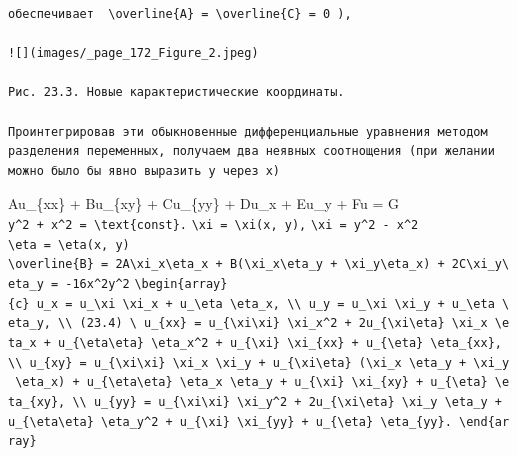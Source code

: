 \documentclass[
  ukrainian,
]{article}
\begin{document}
\begin{verbatim}
обеспечивает  \overline{A} = \overline{C} = 0 ),

![](images/_page_172_Figure_2.jpeg)

Рис. 23.3. Новые карактеристические координаты.

Проинтегрировав эти обыкновенные дифференциальные уравнения методом разделения переменных, получаем два неявных соотнощения (при желании можно было бы явно выразить у через х)
\end{verbatim}

Au\_\{xx\} + Bu\_\{xy\} + Cu\_\{yy\} + Du\_x + Eu\_y + Fu = G
\texttt{y\^{}2\ +\ x\^{}2\ =\ \textbackslash{}text\{const\}.}
\texttt{\textbackslash{}xi\ =\ \textbackslash{}xi(x,\ y),}
\texttt{\textbackslash{}xi\ =\ y\^{}2\ -\ x\^{}2}
\texttt{\textbackslash{}eta\ =\ \textbackslash{}eta(x,\ y)}
\texttt{\textbackslash{}overline\{B\}\ =\ 2A\textbackslash{}xi\_x\textbackslash{}eta\_x\ +\ B(\textbackslash{}xi\_x\textbackslash{}eta\_y\ +\ \textbackslash{}xi\_y\textbackslash{}eta\_x)\ +\ 2C\textbackslash{}xi\_y\textbackslash{}eta\_y\ =\ -16x\^{}2y\^{}2}
\texttt{\textbackslash{}begin\{array\}\{c\}\ u\_x\ =\ u\_\textbackslash{}xi\ \textbackslash{}xi\_x\ +\ u\_\textbackslash{}eta\ \textbackslash{}eta\_x,\ \textbackslash{}\textbackslash{}\ u\_y\ =\ u\_\textbackslash{}xi\ \textbackslash{}xi\_y\ +\ u\_\textbackslash{}eta\ \textbackslash{}eta\_y,\ \textbackslash{}\textbackslash{}\ (23.4)\ \textbackslash{}\ u\_\{xx\}\ =\ u\_\{\textbackslash{}xi\textbackslash{}xi\}\ \textbackslash{}xi\_x\^{}2\ +\ 2u\_\{\textbackslash{}xi\textbackslash{}eta\}\ \textbackslash{}xi\_x\ \textbackslash{}eta\_x\ +\ u\_\{\textbackslash{}eta\textbackslash{}eta\}\ \textbackslash{}eta\_x\^{}2\ +\ u\_\{\textbackslash{}xi\}\ \textbackslash{}xi\_\{xx\}\ +\ u\_\{\textbackslash{}eta\}\ \textbackslash{}eta\_\{xx\},\ \textbackslash{}\textbackslash{}\ u\_\{xy\}\ =\ u\_\{\textbackslash{}xi\textbackslash{}xi\}\ \textbackslash{}xi\_x\ \textbackslash{}xi\_y\ +\ u\_\{\textbackslash{}xi\textbackslash{}eta\}\ (\textbackslash{}xi\_x\ \textbackslash{}eta\_y\ +\ \textbackslash{}xi\_y\ \textbackslash{}eta\_x)\ +\ u\_\{\textbackslash{}eta\textbackslash{}eta\}\ \textbackslash{}eta\_x\ \textbackslash{}eta\_y\ +\ u\_\{\textbackslash{}xi\}\ \textbackslash{}xi\_\{xy\}\ +\ u\_\{\textbackslash{}eta\}\ \textbackslash{}eta\_\{xy\},\ \textbackslash{}\textbackslash{}\ u\_\{yy\}\ =\ u\_\{\textbackslash{}xi\textbackslash{}xi\}\ \textbackslash{}xi\_y\^{}2\ +\ 2u\_\{\textbackslash{}xi\textbackslash{}eta\}\ \textbackslash{}xi\_y\ \textbackslash{}eta\_y\ +\ u\_\{\textbackslash{}eta\textbackslash{}eta\}\ \textbackslash{}eta\_y\^{}2\ +\ u\_\{\textbackslash{}xi\}\ \textbackslash{}xi\_\{yy\}\ +\ u\_\{\textbackslash{}eta\}\ \textbackslash{}eta\_\{yy\}.\ \textbackslash{}end\{array\}}
\end{document}
